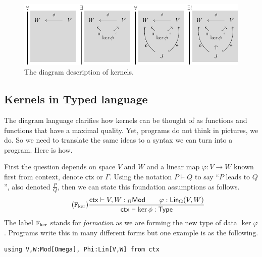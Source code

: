 \documentclass[12pt,twoside,dvipsnames,letterpaper]{memoir}
\begin{document}
\begin{figure}[!htbp]
\begin{center}
    \includegraphics[width=\textwidth]{kernel-graphic.pdf}
\end{center}
\caption{The diagram description of kernels.}
\end{figure}

\subsection{Kernels in Typed language}

The diagram language clarifies how kernels can be thought of as functions and 
functions that have a maximal quality.  Yet, programs do not think in pictures, 
we do.  So we need to translate the same ideas to a syntax we can turn into a 
program.  Here is how.

First the question depends on space $V$ and $W$ and a linear map $\varphi:V\to W$ 
known first from context, denote $\mathsf{ctx}$ or $\Gamma$.  Using the notation 
$P\vdash Q$ to say ``$P$ leads to $Q$'', also denoted $\frac{P}{Q}$, then we can 
state this foundation assumptions as follows.
\begin{gather}
    \tag{$\form{\ker}$}
    \frac{
        \mathsf{ctx} \vdash V,W:{_{\Omega} \mathsf{Mod}}\qquad
        \varphi:\mathsf{Lin}_{\Omega}(V,W)
    }{
        \mathsf{ctx}\vdash \ker\phi:\mathsf{Type}
    }
\end{gather}
The label $\mathtt{F}_{\ker}$ stands for \emph{formation} as we are forming the new 
type of data $\ker\varphi$.  Programs write this in many different forms 
but one example is as the following.
\begin{lstlisting}[language=Sava]
using V,W:Mod[Omega], Phi:Lin[V,W] from ctx
\end{lstlisting}
\end{document}
